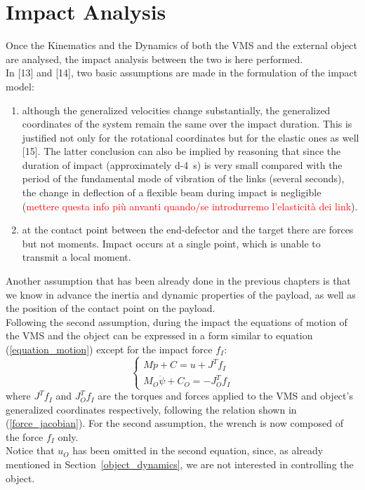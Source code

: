 \documentclass[a4paper,12pt,oneside]{report}
\begin{document}
\chapter{Impact Analysis}
Once the Kinematics and the Dynamics of both the VMS and the external object are analysed, the impact analysis between the two is here performed.\\
In [13] and [14], two basic assumptions are made in the formulation of the impact model:
\begin{enumerate}
  \item although the generalized velocities change substantially, the generalized coordinates of the system remain the same over the impact duration. This is justified not only for the rotational coordinates but for the elastic ones as well [15]. The latter conclusion can also be implied by reasoning that since the duration of impact (approximately \SI{d-4}{\second}) is very small compared with the period of the fundamental mode of vibration of the links (several seconds), the change in deflection of a flexible beam during impact is negligible (\textcolor{red}{mettere questa info più anvanti quando/se introdurremo l'elasticità dei link}).
  \item at the contact point between the end-defector and the target there are forces but not moments. Impact occurs at a single point, which is unable to transmit a local moment.
\end{enumerate}
Another assumption that has been already done in the previous chapters is that we know in advance the inertia and dynamic properties of the payload, as well as the position of the contact point on the payload.\\
Following the second assumption, during the impact the equations of motion of the VMS and the object can be expressed in a form similar to equation (\ref{equation_motion}) except for the impact force $f_I$:
\begin{equation}
  \begin{cases}
    M\ddot{p}+C=u+J^Tf_I\\
    M_O\ddot{\psi}+C_O=-J_O^Tf_I
  \end{cases}
  \label{initial_impact}
\end{equation}
where $J^Tf_I$ and $J_O^Tf_I$ are the torques and forces applied to the VMS and object's generalized coordinates respectively, following the relation shown in (\ref{force_jacobian}). For the second assumption, the wrench is now composed of the force $f_I$ only.\\
Notice that $u_O$ has been omitted in the second equation, since, as already mentioned in Section~\ref{object_dynamics}, we are not interested in controlling the object.\\
\end{document}

